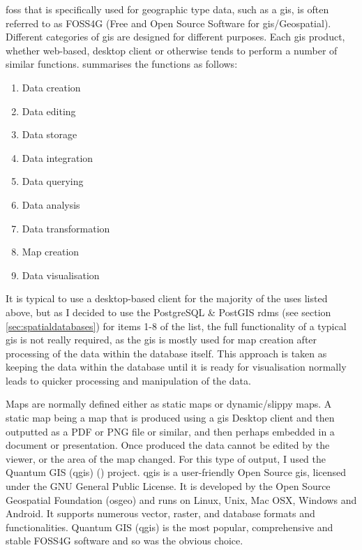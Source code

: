 \gls{foss} that is specifically used for geographic type data, such as a \gls{gis}, is often referred to as FOSS4G (Free and Open Source Software for \gls{gis}/Geospatial). Different categories of \gls{gis} are designed for different purposes. Each \gls{gis} product, whether web-based, desktop client or otherwise tends to perform a number of similar functions. \cite{Steiniger2013} summarises the functions as follows:

\begin{enumerate}
\item Data creation
\item Data editing
\item Data storage
\item Data integration
\item Data querying
\item Data analysis
\item Data transformation
\item Map creation
\item Data visualisation 
\end{enumerate}

It is typical to use a desktop-based client for the majority of the uses listed above, but as I decided to use the PostgreSQL \& PostGIS \gls{rdms} (see section \ref{sec:spatialdatabases}) for items 1-8 of the list, the full functionality of a typical \gls{gis} is not really required, as the \gls{gis} is mostly used for map creation after processing of the data within the database itself. This approach is taken as keeping the data within the database until it is ready for visualisation normally leads to quicker processing and manipulation of the data.

Maps are normally defined either as static maps or dynamic/slippy maps. A static map being a map that is produced using a \gls{gis} Desktop client and then outputted as a PDF or PNG file or similar, and then perhaps embedded in a document or presentation. Once produced the data cannot be edited by the viewer, or the area of the map changed. For this type of output, I used the Quantum GIS (\gls{qgis}) (\cite{qgis2014}) project. \gls{qgis} is a user-friendly Open Source \gls{gis}, licensed under the GNU General Public License. It is developed by the Open Source Geospatial Foundation (\gls{osgeo}) and runs on Linux, Unix, Mac OSX, Windows and Android. It supports numerous vector, raster, and database formats and functionalities. Quantum GIS (\gls{qgis}) is the most popular, comprehensive and stable FOSS4G software and so was the obvious choice.

